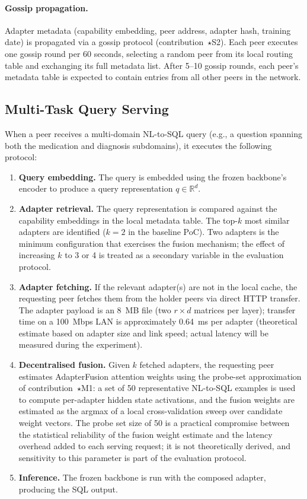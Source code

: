\paragraph{Gossip propagation.}
Adapter metadata (capability embedding, peer address, adapter hash, training date) is
propagated via a gossip protocol (contribution~$\star$S2). Each peer executes one gossip
round per 60 seconds, selecting a random peer from its local routing table and exchanging
its full metadata list. After 5--10 gossip rounds, each peer's metadata table is
expected to contain entries from all other peers in the network.

\subsection{Multi-Task Query Serving}
\label{sec:poc:serving}

When a peer receives a multi-domain NL-to-SQL query (e.g., a question spanning both
the medication and diagnosis subdomains), it executes the following protocol:

\begin{enumerate}
  \item \textbf{Query embedding.} The query is embedded using the frozen backbone's
    encoder to produce a query representation $q \in \mathbb{R}^{d}$.
\item \textbf{Adapter retrieval.} The query representation is compared against the
    capability embeddings in the local metadata table. The top-$k$ most similar adapters
    are identified ($k = 2$ in the baseline PoC). Two adapters is the minimum 
    configuration that exercises the fusion mechanism; the effect of increasing $k$ 
    to 3 or 4 is treated as a secondary variable in the evaluation protocol.
\item \textbf{Adapter fetching.} If the relevant adapter(s) are not in the local
    cache, the requesting peer fetches them from the holder peers via direct HTTP
    transfer. The adapter payload is an 8~MB file (two $r \times d$ matrices per 
    layer); transfer time on a 100~Mbps LAN is approximately 0.64~ms per adapter 
    (theoretical estimate based on adapter size and link speed; actual latency 
    will be measured during the experiment).
\item \textbf{Decentralised fusion.} Given $k$ fetched adapters, the requesting peer
    estimates AdapterFusion attention weights using the probe-set approximation of
    contribution~$\star$M1: a set of 50 representative NL-to-SQL examples is used to
    compute per-adapter hidden state activations, and the fusion weights are estimated
    as the argmax of a local cross-validation sweep over candidate weight vectors. 
    The probe set size of 50 is a practical compromise between the statistical 
    reliability of the fusion weight estimate and the latency overhead added to 
    each serving request; it is not theoretically derived, and sensitivity to 
    this parameter is part of the evaluation protocol.
  \item \textbf{Inference.} The frozen backbone is run with the composed adapter,
    producing the SQL output.
\end{enumerate}

